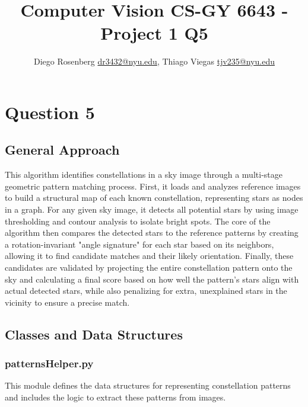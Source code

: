 \documentclass[a4paper,11pt]{article}
\makeatletter
\renewcommand{\maketitle}{\bgroup\setlength{\parindent}{0pt}
\begin{flushleft}
  \thispagestyle{plain}
  \textbf{\@title}

  \@author
\end{flushleft}\egroup
}
\makeatother
\begin{document}
\title{\Large Computer Vision CS-GY 6643 - Project 1 Q5
\newline}
\author{Diego Rosenberg \href{mailto:dr3432@nyu.edu}{dr3432@nyu.edu}, Thiago Viegas \href{mailto:tjv235@nyu.edu}{tjv235@nyu.edu}}



\date{}

\maketitle
\section{Question 5}
\subsection{General Approach}
This algorithm identifies constellations in a sky image through a multi-stage geometric pattern matching process. First, it loads and analyzes reference images to build a structural map of each known constellation, representing stars as nodes in a graph. For any given sky image, it detects all potential stars by using image thresholding and contour analysis to isolate bright spots. The core of the algorithm then compares the detected stars to the reference patterns by creating a rotation-invariant "angle signature" for each star based on its neighbors, allowing it to find candidate matches and their likely orientation. Finally, these candidates are validated by projecting the entire constellation pattern onto the sky and calculating a final score based on how well the pattern's stars align with actual detected stars, while also penalizing for extra, unexplained stars in the vicinity to ensure a precise match.

\subsection{Classes and Data Structures}
\subsubsection*{patternsHelper.py}
\hrulefill

This module defines the data structures for representing constellation patterns and includes the logic to extract these patterns from images.
\end{document}
